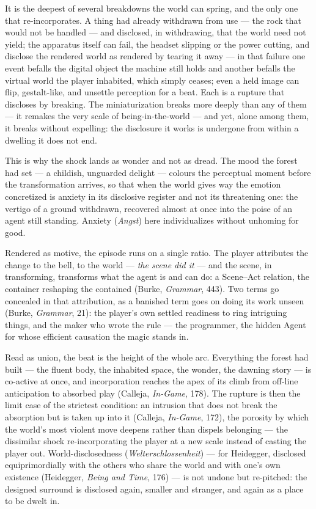 \documentclass{article}
\begin{document}
It is the deepest of several breakdowns the world can spring, and the only one that re-incorporates. A thing had already withdrawn from use — the rock that would not be handled — and disclosed, in withdrawing, that the world need not yield; the apparatus itself can fail, the headset slipping or the power cutting, and disclose the rendered world as rendered by tearing it away — in that failure one event befalls the digital object the machine still holds and another befalls the virtual world the player inhabited, which simply ceases; even a held image can flip, gestalt-like, and unsettle perception for a beat. Each is a rupture that discloses by breaking. The miniaturization breaks more deeply than any of them — it remakes the very scale of being-in-the-world — and yet, alone among them, it breaks without expelling: the disclosure it works is undergone from within a dwelling it does not end.

This is why the shock lands as wonder and not as dread. The mood the forest had set — a childish, unguarded delight — colours the perceptual moment before the transformation arrives, so that when the world gives way the emotion concretized is anxiety in its disclosive register and not its threatening one: the vertigo of a ground withdrawn, recovered almost at once into the poise of an agent still standing. Anxiety (\textit{Angst}) here individualizes without unhoming for good.

Rendered as motive, the episode runs on a single ratio. The player attributes the change to the bell, to the world — \textit{the scene did it} — and the scene, in transforming, transforms what the agent is and can do: a Scene–Act relation, the container reshaping the contained (Burke, \textit{Grammar}, 443). Two terms go concealed in that attribution, as a banished term goes on doing its work unseen (Burke, \textit{Grammar}, 21): the player's own settled readiness to ring intriguing things, and the maker who wrote the rule — the programmer, the hidden Agent for whose efficient causation the magic stands in.

Read as union, the beat is the height of the whole arc. Everything the forest had built — the fluent body, the inhabited space, the wonder, the dawning story — is co-active at once, and incorporation reaches the apex of its climb from off-line anticipation to absorbed play (Calleja, \textit{In-Game}, 178). The rupture is then the limit case of the strictest condition: an intrusion that does not break the absorption but is taken up into it (Calleja, \textit{In-Game}, 172), the porosity by which the world's most violent move deepens rather than dispels belonging — the dissimilar shock re-incorporating the player at a new scale instead of casting the player out. World-disclosedness (\textit{Welterschlossenheit}) — for Heidegger, disclosed equiprimordially with the others who share the world and with one's own existence (Heidegger, \textit{Being and Time}, 176) — is not undone but re-pitched: the designed surround is disclosed again, smaller and stranger, and again as a place to be dwelt in.
\end{document}
